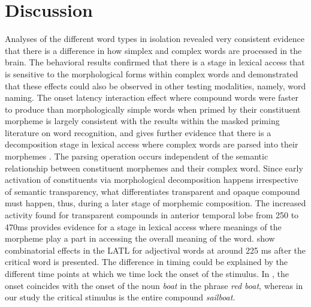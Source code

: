 \documentclass{frontiersSCNS}
\begin{document}
\section{Discussion}
	Analyses of the different word types in isolation revealed very consistent evidence that there is a difference in how simplex and complex words are processed in the brain. The behavioral results confirmed that there is a stage in lexical access that is sensitive to the morphological forms within complex words and demonstrated that these effects could also be observed in other testing modalities, namely, word naming. The onset latency interaction effect where compound words were faster to produce than morphologically simple words when primed by their constituent morpheme is largely consistent with the results within the masked priming literature on word recognition, and gives further evidence that there is a decomposition stage in lexical access where complex words are parsed into their morphemes \citep{Rastle:2004, Taft:2004, Morris:2007, McCormick:2008, Fiorentino:2009}. The parsing operation occurs independent of the semantic relationship between constituent morphemes and their complex word. 
	Since early activation of constituents via morphological decomposition happens irrespective of semantic transparency, what differentiates transparent and opaque compound must happen, thus, during a later stage of morphemic composition.
The increased activity found for transparent compounds in anterior temporal lobe from 250 to 470ms provides evidence for a stage in lexical access where meanings of the morpheme play a part in accessing the overall meaning of the word. \cite{Bemis:2011} show combinatorial effects in the LATL for adjectival words at around 225 ms after the critical word is presented.  The difference in timing could be explained by the different time points at which we time lock the onset of the stimulus. In \cite{Bemis:2011}, the onset coincides with the onset of the noun \textit{boat} in the phrase \textit{red boat}, whereas in our study the critical stimulus is the entire compound \textit{sailboat}.
\end{document}
